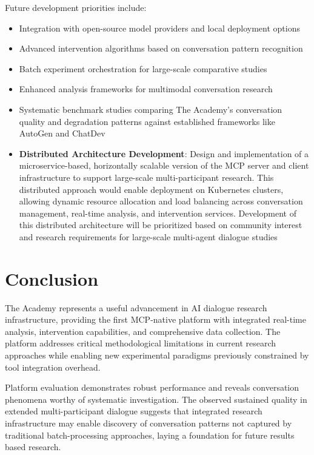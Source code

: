 \documentclass[11pt,letterpaper]{article}
\newcommand{\theacademy}{The Academy}
\newcommand{\mcp}{MCP}
\begin{document}
Future development priorities include:
\begin{itemize}
    \item Integration with open-source model providers and local deployment options
    \item Advanced intervention algorithms based on conversation pattern recognition
    \item Batch experiment orchestration for large-scale comparative studies
    \item Enhanced analysis frameworks for multimodal conversation research
    \item Systematic benchmark studies comparing The Academy's conversation quality and degradation patterns against established frameworks like AutoGen and ChatDev
    \item \textbf{Distributed Architecture Development}: Design and implementation of a microservice-based, horizontally scalable version of the MCP server and client infrastructure to support large-scale multi-participant research. This distributed approach would enable deployment on Kubernetes clusters, allowing dynamic resource allocation and load balancing across conversation management, real-time analysis, and intervention services. Development of this distributed architecture will be prioritized based on community interest and research requirements for large-scale multi-agent dialogue studies
\end{itemize}

\section{Conclusion}

\theacademy{} represents a useful advancement in AI dialogue research infrastructure, providing the first \mcp{}-native platform with integrated real-time analysis, intervention capabilities, and comprehensive data collection. The platform addresses critical methodological limitations in current research approaches while enabling new experimental paradigms previously constrained by tool integration overhead.

Platform evaluation demonstrates robust performance and reveals conversation phenomena worthy of systematic investigation. The observed sustained quality in extended multi-participant dialogue suggests that integrated research infrastructure may enable discovery of conversation patterns not captured by traditional batch-processing approaches, laying a foundation for future results based research.
\end{document}
